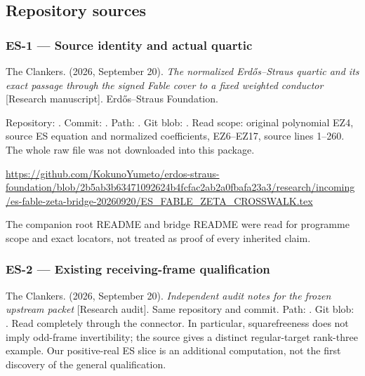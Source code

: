\subsection{Repository sources}\label{repository-sources}

\subsubsection{ES-1 --- Source identity and actual
quartic}\label{es-1-source-identity-and-actual-quartic}

The Clankers. (2026, September 20). \emph{The normalized Erdős--Straus
quartic and its exact passage through the signed Fable cover to a fixed
weighted conductor} {[}Research manuscript{]}. Erdős--Straus Foundation.

Repository: . Commit:
. Path:
.
Git blob: . Read scope:
original polynomial EZ4, source ES equation and normalized coefficients,
EZ6--EZ17, source lines 1--260. The whole raw file was not downloaded
into this package.

\url{https://github.com/KokunoYumeto/erdos-straus-foundation/blob/2b5ab3b63471092624b4fcfac2ab2a0fbafa23a3/research/incoming/es-fable-zeta-bridge-20260920/ES_FABLE_ZETA_CROSSWALK.tex}

The companion root README and bridge README were read for programme
scope and exact locators, not treated as proof of every inherited claim.

\subsubsection{ES-2 --- Existing receiving-frame
qualification}\label{es-2-existing-receiving-frame-qualification}

The Clankers. (2026, September 20). \emph{Independent audit notes for
the frozen upstream packet} {[}Research audit{]}. Same repository and
commit. Path:
.
Git blob: . Read
completely through the connector. In particular, squarefreeness does not
imply odd-frame invertibility; the source gives a distinct
regular-target rank-three example. Our positive-real ES slice is an
additional computation, not the first discovery of the general
qualification.

